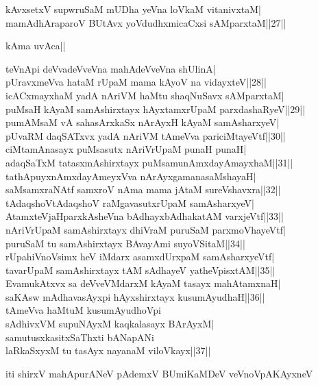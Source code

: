 \documentclass{article}
\begin{document}
kAvxsetxV supwruSaM mUDha yeVna loVkaM vitanivxtaM|\\
mamAdhAraparoV BUtAvx yoVdudhxmicaCxsi sAMparxtaM||27||\\

\begin{center}
kAma uvAca||
\end{center}

teVnApi deVvadeVveVna mahAdeVveVna shUlinA|\\
pUravxmeVva hataM rUpaM mama kAyoV na vidayxteV||28||\\
icACxmayxhaM yadA nAriVM haMtu shaqNuSavx sAMparxtaM|\\
puMsaH kAyaM samAshirxtayx hAyxtamxrUpaM parxdashaRyeV||29||\\
pumAMsaM vA sahasArxkaSx nArAyxH kAyaM samAsharxyeV|\\
pUvaRM daqSATxvx yadA nAriVM tAmeVva pariciMtayeVtf||30||\\
ciMtamAnasayx puMsasutx nAriVrUpaM punaH punaH|\\
adaqSaTxM tatasxmAshirxtayx puMsamunAmxdayAmayxhaM||31||\\
tathApuyxnAmxdayAmeyxVva nArAyxgamanasaMshayaH|\\
saMsamxraNAtf samxroV nAma mama jAtaM sureVshavxra||32||\\
tAdaqshoVtAdaqshoV raMgavasutxrUpaM samAsharxyeV|\\
AtamxteVjaHparxkAsheVna bAdhayxbAdhakatAM varxjeVtf||33||\\
nAriVrUpaM samAshirxtayx dhiVraM puruSaM parxmoVhayeVtf|\\
puruSaM tu samAshirxtayx BAvayAmi suyoVSitaM||34||\\
rUpahiVnoVsimx heV iMdarx asamxdUrxpaM samAsharxyeVtf|\\
tavarUpaM samAshirxtayx tAM sAdhayeV yatheVpisxtAM||35||\\
EvamukAtxvx sa deVveVMdarxM kAyaM tasayx mahAtamxnaH|\\
saKAsw mAdhavasAyxpi hAyxshirxtayx kusumAyudhaH||36||\\
tAmeVva haMtuM kusumAyudhoVpi\\
sAdhivxVM supuNAyxM kaqkalasayx BArAyxM|\\
samutusxkasitxSaThxti bANapANi\\
laRkaSxyxM tu tasAyx nayanaM viloVkayx||37||

\begin{center}
iti shirxV mahApurANeV pAdemxV BUmiKaMDeV veVnoVpAKAyxneV
\end{center}
\end{document}
